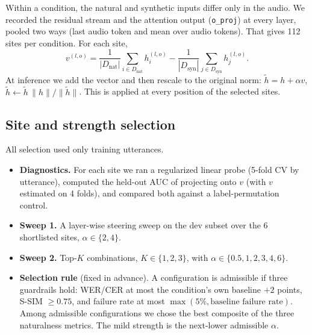 \documentclass[11pt]{article}
\begin{document}
Within a condition, the natural and synthetic inputs differ only in the audio. We recorded the residual stream and the attention output (\texttt{o\_proj}) at every layer, pooled two ways (last audio token and mean over audio tokens). That gives 112 sites per condition. For each site,
\[
v^{(l,o)} = \frac{1}{|D_{\text{nat}}|}\sum_{i\in D_{\text{nat}}} h_i^{(l,o)} - \frac{1}{|D_{\text{syn}}|}\sum_{j\in D_{\text{syn}}} h_j^{(l,o)} .
\]
At inference we add the vector and then rescale to the original norm: $\tilde h = h+\alpha v$, $\tilde h \leftarrow \tilde h\,\|h\|/\|\tilde h\|$. This is applied at every position of the selected sites.

\subsection{Site and strength selection}
All selection used only training utterances.
\begin{itemize}
\item \textbf{Diagnostics.} For each site we ran a regularized linear probe (5-fold CV by utterance), computed the held-out AUC of projecting onto $v$ (with $v$ estimated on 4 folds), and compared both against a label-permutation control.
\item \textbf{Sweep 1.} A layer-wise steering sweep on the dev subset over the 6 shortlisted sites, $\alpha\in\{2,4\}$.
\item \textbf{Sweep 2.} Top-$K$ combinations, $K\in\{1,2,3\}$, with $\alpha\in\{0.5,1,2,3,4,6\}$.
\item \textbf{Selection rule} (fixed in advance). A configuration is admissible if three guardrails hold: WER/CER at most the condition's own baseline $+2$ points, S-SIM $\ge0.75$, and failure rate at most $\max(5\%,\text{baseline failure rate})$. Among admissible configurations we chose the best composite of the three naturalness metrics. The mild strength is the next-lower admissible $\alpha$.
\end{itemize}
\end{document}
